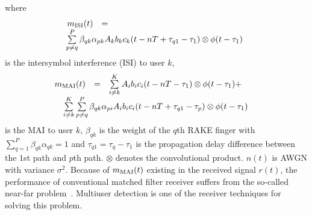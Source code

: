 \documentclass[conference]{IEEEtran}
\begin{document}
\noindent where
\begin{equation} \hspace{-0.05in}
\begin{array}{rcl}
 m_{\rm ISI}(t)&=&\\
 &&\hspace{-0.83in}\sum\limits^{P}_{p\neq
q}\beta_{qk} \alpha_{pk}A_kb_kc_k(t-nT+\tau_{q1}-\tau_1)\otimes
\phi(t-\tau_1)
\end{array}
\end{equation}
\noindent is the intersymbol interference (ISI) to user $k$,
\begin{equation} \hspace{-0.17in}
\begin{array}{rcl}
m_{\rm MAI}(t)&=&\sum\limits_{i\neq
 k}^{K}A_ib_ic_i(t-nT-\tau_1)\otimes\phi(t-\tau_1)+\\
 &&\hspace{-0.75in}\sum\limits_{i\neq
 k}^{K}\sum\limits^{P}_{p\neq
q}\beta_{qk}
\alpha_{pi}A_ib_ic_i(t-nT+\tau_{q1}-\tau_p)\otimes\phi(t-\tau_1)
\end{array}
\end{equation}
\noindent is the MAI to user $k$, $\beta_{qk}$ is the weight of
the $q$th RAKE finger with
$\sum\limits_{q=1}^{P}\beta_{qk}\alpha_{qk}=1$ and $\tau_{q1} =
\tau_{q}-\tau_1$ is the propagation delay difference between the
$1$st path and $p$th path. $\otimes$ denotes the convolutional
product. $n(t)$ is AWGN with variance $\sigma^2$. Because of
$m_{\rm MAI}(t)$ existing in the received signal $r(t)$, the
performance of conventional matched filter receiver suffers from
the so-called near-far problem~\cite{Verd98}. Multiuser detection
is one of the receiver techniques for solving this problem.
\end{document}
